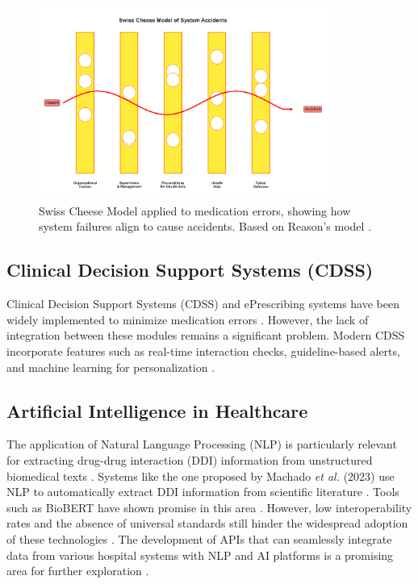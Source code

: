 \begin{figure}[htbp]
    \centering
    \includegraphics[width=0.85\textwidth]{images/generated/swiss_cheese_model.png}
    \caption{Swiss Cheese Model applied to medication errors, showing how system failures align to cause accidents. Based on Reason's model \citep{ciapponi2021, mulac2020}.}
    \label{fig:swiss_cheese_model}
\end{figure}

\subsection{Clinical Decision Support Systems (CDSS)}

Clinical Decision Support Systems (CDSS) \cite{moss2015, belle2013} and ePrescribing systems have been widely implemented to minimize medication errors \cite{belle2013biomedical, hawley2019}. However, the lack of integration between these modules remains a significant problem. Modern CDSS incorporate features such as real-time interaction checks, guideline-based alerts, and machine learning for personalization \cite{bates2021, zhao2021}.

\subsection{Artificial Intelligence in Healthcare}

The application of Natural Language Processing (NLP) \cite{rozenblum2020} is particularly relevant for extracting drug-drug interaction (DDI) information from unstructured biomedical texts \cite{javaid2022medical}. Systems like the one proposed by Machado \textit{et al.} (2023) use NLP to automatically extract DDI information from scientific literature \cite{machado2023drug}. Tools such as BioBERT have shown promise in this area \cite{Russell2023}. However, low interoperability rates and the absence of universal standards still hinder the widespread adoption of these technologies \citep{Chaya2023}. The development of APIs that can seamlessly integrate data from various hospital systems with NLP and AI platforms is a promising area for further exploration \cite{López2021}.

